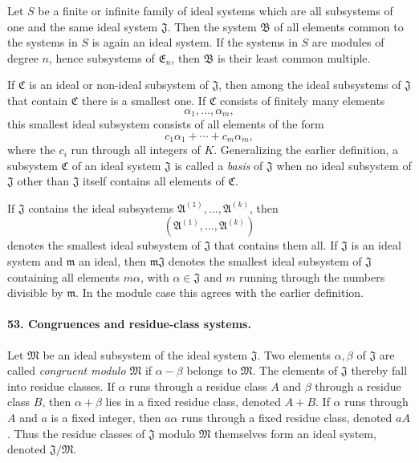 \documentclass[11pt]{article}
\begin{document}
Let $S$ be a finite or infinite family of ideal systems which are all subsystems of one and the same ideal system $\mathfrak J$. Then the system $\mathfrak B$ of all elements common to the systems in $S$ is again an ideal system. If the systems in $S$ are modules of degree $n$, hence subsystems of $\mathfrak E_n$, then $\mathfrak B$ is their least common multiple.

If $\mathfrak C$ is an ideal or non-ideal subsystem of $\mathfrak J$, then among the ideal subsystems of $\mathfrak J$ that contain $\mathfrak C$ there is a smallest one. If $\mathfrak C$ consists of finitely many elements
\[
  \alpha_1,\ldots,\alpha_m,
\]
this smallest ideal subsystem consists of all elements of the form
\begin{equation}
  c_1\alpha_1+\cdots+c_m\alpha_m,
\tag{87}
\end{equation}
where the $c_i$ run through all integers of $K$. Generalizing the earlier definition, a subsystem $\mathfrak C$ of an ideal system $\mathfrak J$ is called a \emph{basis} of $\mathfrak J$ when no ideal subsystem of $\mathfrak J$ other than $\mathfrak J$ itself contains all elements of $\mathfrak C$.

If $\mathfrak J$ contains the ideal subsystems $\mathfrak A^{(1)},\ldots,\mathfrak A^{(k)}$, then
\[
  (\mathfrak A^{(1)},\ldots,\mathfrak A^{(k)})
\]
denotes the smallest ideal subsystem of $\mathfrak J$ that contains them all. If $\mathfrak J$ is an ideal system and $\mathfrak m$ an ideal, then $\mathfrak m\mathfrak J$ denotes the smallest ideal subsystem of $\mathfrak J$ containing all elements $m\alpha$, with $\alpha\in\mathfrak J$ and $m$ running through the numbers divisible by $\mathfrak m$. In the module case this agrees with the earlier definition.

\paragraph{53. Congruences and residue-class systems.}
Let $\mathfrak M$ be an ideal subsystem of the ideal system $\mathfrak J$. Two elements $\alpha,\beta$ of $\mathfrak J$ are called \emph{congruent modulo $\mathfrak M$} if $\alpha-\beta$ belongs to $\mathfrak M$. The elements of $\mathfrak J$ thereby fall into residue classes. If $\alpha$ runs through a residue class $A$ and $\beta$ through a residue class $B$, then $\alpha+\beta$ lies in a fixed residue class, denoted $A+B$. If $\alpha$ runs through $A$ and $a$ is a fixed integer, then $a\alpha$ runs through a fixed residue class, denoted $aA$. Thus the residue classes of $\mathfrak J$ modulo $\mathfrak M$ themselves form an ideal system, denoted $\mathfrak J/\mathfrak M$.
\end{document}
